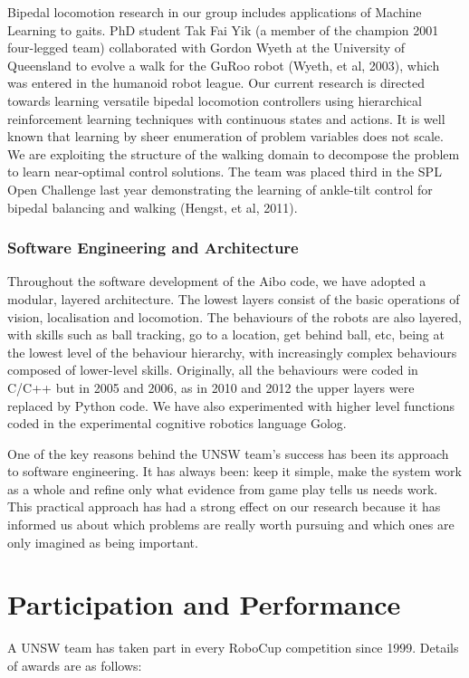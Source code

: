 \documentclass[runningheads,a4paper]{llncs}
\begin{document}
Bipedal locomotion research in our group includes applications of Machine Learning to gaits. PhD student Tak Fai Yik (a member of the champion 2001 four-legged team) collaborated with Gordon Wyeth at the University of Queensland to evolve a walk for the GuRoo robot (Wyeth, et al, 2003), which was entered in the humanoid robot league. Our current research is directed towards  learning versatile bipedal locomotion controllers using hierarchical reinforcement learning techniques with continuous states and actions. It is well known that learning by sheer enumeration of problem variables does not scale. We are exploiting the structure of the walking domain to decompose the problem to learn near-optimal control solutions. The team was placed third in the SPL Open Challenge last year demonstrating the learning of ankle-tilt control for bipedal balancing and walking  (Hengst, et al, 2011).   

\subsubsection{Software Engineering and Architecture}
Throughout the software development of the Aibo code, we have adopted a modular, layered architecture. The lowest layers consist of the basic operations of vision, localisation and locomotion. The behaviours of the robots are also layered, with skills such as ball tracking, go to a location, get behind ball, etc, being at the lowest level of the behaviour hierarchy, with increasingly complex behaviours composed of lower-level skills. Originally, all the behaviours were coded in C/C++ but in 2005 and 2006, as in 2010 and 2012 the upper layers were replaced by Python code.  We have also experimented with higher level functions coded in the experimental cognitive robotics language Golog. 

One of the key reasons behind the UNSW team's success has been its approach to software engineering. It has always been: keep it simple, make the system work as a whole and refine only what evidence from game play tells us needs work. This practical approach has had a strong effect on our research because it has informed us about which problems are really worth pursuing and which ones are only imagined as being important.

\section{Participation and Performance}

A UNSW team has taken part in every RoboCup competition since 1999. Details of awards are as follows:
\end{document}
